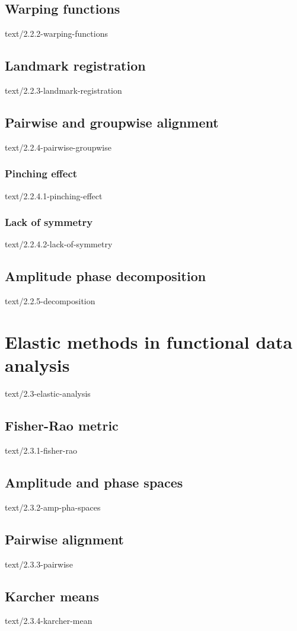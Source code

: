 \documentclass[epsbased,copyleft,final,loe, lof,extendedindex,firstnumbered,tfg,covers,english]{tfgtfmthesisuam}
\begin{document}
  \subsection{Warping functions\label{SEC:WARPING}}{text/2.2.2-warping-functions}
  \subsection{Landmark registration\label{SEC:LANDMARK}}{text/2.2.3-landmark-registration}
  \subsection{Pairwise and groupwise alignment\label{SEC:L2PAIRWISE}}{text/2.2.4-pairwise-groupwise}
    \subsubsection{Pinching effect\label{SSEC:PINCHING}}{text/2.2.4.1-pinching-effect}
    \subsubsection{Lack of symmetry\label{SSEC:SIMMETRY}}{text/2.2.4.2-lack-of-symmetry}
  \subsection{Amplitude phase decomposition\label{SEC:DECOMPOSITION}}{text/2.2.5-decomposition}

\section{Elastic methods in functional data analysis\label{SEC:ELASTIC}}{text/2.3-elastic-analysis}
  \subsection{Fisher-Rao metric\label{SEC:FISHERRAO}}{text/2.3.1-fisher-rao}
  \subsection{Amplitude and phase spaces\label{SEC:AMPPHA}}{text/2.3.2-amp-pha-spaces}
  \subsection{Pairwise alignment\label{SEC:PAIRWISE}}{text/2.3.3-pairwise}
  \subsection{Karcher means\label{SEC:KARCHER}}{text/2.3.4-karcher-mean}
\end{document}
